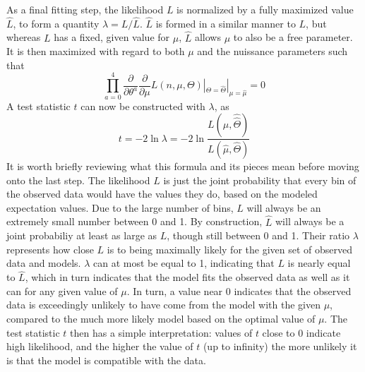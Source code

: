     As a final fitting step, the likelihood $L$ is normalized by a fully maximized value $\hat L$,
        to form a quantity $\lambda = L / \hat L$.
    $\hat L$ is formed in a similar manner to $L$, but whereas $L$ has a fixed, given value for $\mu$,
        $\hat L$ allows $\mu$ to also be a free parameter.
    It is then maximized with regard to both $\mu$ and the nuissance parameters such that
    \begin{equation}
        \prod \limits_{a=0}^{4} \frac{\partial}{\partial \theta^a} \frac{\partial}{\partial \mu} L(n,\mu,\Theta) |_{\Theta=\hat \Theta} |_{\mu=\hat \mu} = 0
    \end{equation}
    A test statistic $t$ can now be constructed with $\lambda$, as
    \begin{equation}
        t = -2 \ln{\lambda} = -2 \ln{\frac{L(\mu, \hat {\hat \Theta})}{L(\hat \mu, \hat \Theta)}}
    \end{equation}
    It is worth briefly reviewing what this formula and its pieces mean before moving onto the last step.
    The likelihood $L$ is just the joint probability that every bin of the observed data would have the values they do,
        based on the modeled expectation values.
    Due to the large number of bins, $L$ will always be an extremely small number between 0 and 1.
    By construction, $\hat L$ will always be a joint probabiliy at least as large as $L$, though still between 0 and 1.
    Their ratio $\lambda$ represents how close $L$ is to being maximally likely for the given set of observed data and models.
    $\lambda$ can at most be equal to 1, indicating that $L$ is nearly equal to $\hat L$,
        which in turn indicates that the model fits the observed data as well as it can for any given value of $\mu$.
    In turn, a value near 0 indicates that the observed data is exceedingly unlikely to have come from the model with the given $\mu$,
        compared to the much more likely model based on the optimal value of $\mu$.
    The test statistic $t$ then has a simple interpretation:
        values of $t$ close to 0 indicate high likelihood,
        and the higher the value of $t$ (up to infinity) the more unlikely it is that the model is compatible with the data.

